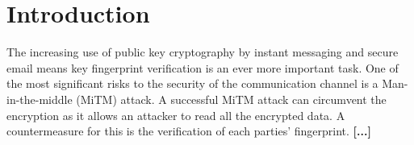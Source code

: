 \chapter{Introduction}
\label{cha:Introduction}

The increasing use of public key cryptography by instant messaging and secure email means key fingerprint  verification is an ever more important task. One of the most significant risks to the security of the communication channel is a Man-in-the-middle (MiTM) attack. A successful MiTM attack can circumvent the encryption as it allows an attacker to read all the encrypted data. A countermeasure for this is the verification of each parties' fingerprint. \textbf{[...]}